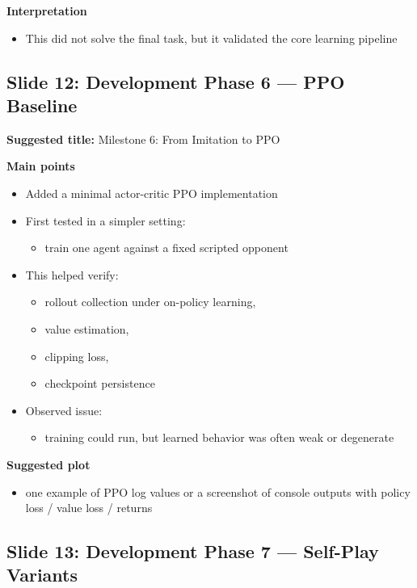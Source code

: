 \documentclass[11pt]{article}
\begin{document}
\textbf{Interpretation}
\begin{itemize}
    \item This did not solve the final task, but it validated the core learning pipeline
\end{itemize}

\subsection*{Slide 12: Development Phase 6 --- PPO Baseline}

\textbf{Suggested title:} Milestone 6: From Imitation to PPO

\textbf{Main points}
\begin{itemize}
    \item Added a minimal actor-critic PPO implementation
    \item First tested in a simpler setting:
    \begin{itemize}
        \item train one agent against a fixed scripted opponent
    \end{itemize}
    \item This helped verify:
    \begin{itemize}
        \item rollout collection under on-policy learning,
        \item value estimation,
        \item clipping loss,
        \item checkpoint persistence
    \end{itemize}
    \item Observed issue:
    \begin{itemize}
        \item training could run, but learned behavior was often weak or degenerate
    \end{itemize}
\end{itemize}

\textbf{Suggested plot}
\begin{itemize}
    \item one example of PPO log values or a screenshot of console outputs with policy loss / value loss / returns
\end{itemize}

\subsection*{Slide 13: Development Phase 7 --- Self-Play Variants}
\end{document}
